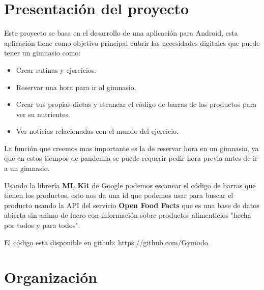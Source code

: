 \documentclass[12pt,a4paper]{article}
\begin{document}
\newpage

\tableofcontents

\newpage

\section{Presentación del proyecto}
Este proyecto se basa en el desarrollo de una aplicación para Android, esta aplicación tiene como objetivo principal cubrir las necesidades digitales que puede tener un gimnasio como:

\begin{itemize}
\item Crear rutinas y ejercicios.
\item Reservar una hora para ir al gimnasio.
\item Crear tus propias dietas y escanear el código de barras de los productos para ver su nutrientes.
\item Ver noticias relacionadas con el mundo del ejercicio.
\end{itemize}

La función que creemos mas importante es la de reservar hora en un gimnasio, ya que en estos tiempos de pandemia se puede requerir pedir hora previa antes de ir a un gimnasio.

Usando la librería \textbf{ML Kit} de Google podemos escanear el código de barras que tienen los productos, esto nos da una id que podemos usar para buscar el producto usando la API del servicio \textbf{Open Food Facts} que es una base de datos abierta sin animo de lucro con información sobre productos alimenticios "hecha por todos y para todos".


El código esta disponible en github: \href{https://github.com/Gymodo}{https://github.com/Gymodo}

\newpage

\section{Organización}
\end{document}
